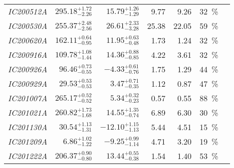 \begin{table*}
\begin{tabular}{l r r r r c c}
    \emph{IC200512A} & $295.18^{+1.72}_{-2.26}$ & $15.79^{+1.26}_{-1.29}$  & 9.77                 & 9.26                 & \SI{32}{\percent}  & \cite{IC200512A1, IC200512A2}                         \\
    \emph{IC200530A} & $255.37^{+2.48}_{-2.56}$ & $26.61^{+2.33}_{-3.28}$  & 25.38                & 22.05                & \SI{59}{\percent}  & \cite{IC200530A1, IC200530A2, IC200530A3, IC200530A4} \\
    \emph{IC200620A} & $162.11^{+0.64}_{-0.95}$ & $11.95^{+0.63}_{-0.48}$  & 1.73                 & 1.24                 & \SI{32}{\percent}  & \cite{IC200620A1, IC200620A2}                         \\
    \emph{IC200916A} & $109.78^{+1.08}_{-1.44}$ & $14.36^{+0.88}_{-0.85}$  & 4.22                 & 3.61                 & \SI{32}{\percent}  & \cite{IC200916A1, IC200916A2, IC200916A3}             \\
    \emph{IC200926A} & $96.46^{+0.73}_{-0.55}$  & $-4.33^{+0.61}_{-0.76}$  & 1.75                 & 1.29                 & \SI{44}{\percent}  & \cite{IC200926A1, IC200926A2}                         \\
    \emph{IC200929A} & $29.53^{+0.53}_{-0.53}$  & $3.47^{+0.71}_{-0.35}$   & 1.12                 & 0.87                 & \SI{47}{\percent}  & \cite{IC200929A1, IC200929A2}                         \\
    \emph{IC201007A} & $265.17^{+0.52}_{-0.52}$ & $5.34^{+0.32}_{-0.23}$   & 0.57                 & 0.55                 & \SI{88}{\percent}  & \cite{IC201007A1, IC201007A2}                         \\
    \emph{IC201021A} & $260.82^{+1.73}_{-1.68}$ & $14.55^{+1.35}_{-0.74}$  & 6.89                 & 6.30                 & \SI{30}{\percent}  & \cite{IC201021A1, IC201021A2}                         \\
    \emph{IC201130A} & $30.54^{+1.13}_{-1.31}$  & $-12.10^{+1.15}_{-1.13}$ & 5.44                 & 4.51                 & \SI{15}{\percent}  & \cite{IC201130A1, IC201130A2}                         \\
    \emph{IC201209A} & $6.86^{+1.02}_{-1.22}$   & $-9.25^{+0.99}_{-1.14}$  & 4.71                 & 3.20                 & \SI{19}{\percent}  & \cite{IC201209A1, IC201209A2}                         \\
    \emph{IC201222A} & $206.37^{+0.90}_{-0.80}$ & $13.44^{+0.55}_{-0.38}$  & 1.54                 & 1.40                 & \SI{53}{\percent}  & \cite{IC201222A1, IC201222A2}                         \\

\end{tabular}
\end{table*}
